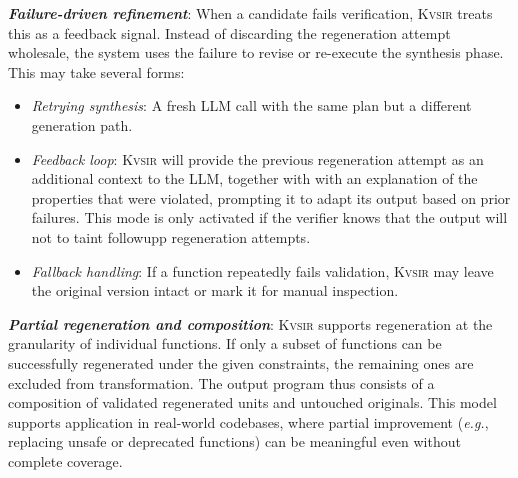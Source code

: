 \documentclass[sigplan]{acmart}
\def\eg{{\em e.g.}, }
\newcommand{\sys}{{\scshape Kv{\textalpha}sir}\xspace}
\newcommand{\heading}[1]{\vspace{2pt}\noindent\textbf{\emph{#1}}:\enspace}
\begin{document}
\heading{Failure-driven refinement}
When a candidate fails verification, \sys treats this as a feedback signal. Instead of discarding the regeneration attempt wholesale, the system uses the failure to revise or re-execute the synthesis phase. This may take several forms:
\begin{itemize}
  \item \emph{Retrying synthesis}: A fresh LLM call with the same plan but a different generation path.
  \item \emph{Feedback loop}: \sys will provide the previous regeneration attempt 
    as an additional context to the LLM, together with with an explanation of the properties that were violated, prompting it to adapt its output based on prior failures.
    This mode is only activated if the verifier knows that the output will not to taint
    followupp regeneration attempts.
  \item \emph{Fallback handling}: If a function repeatedly fails validation, \sys may leave the original version intact or mark it for manual inspection.
\end{itemize}


\heading{Partial regeneration and composition}
\sys supports regeneration at the granularity of individual functions. If only a subset of functions can be successfully regenerated under the given constraints, the remaining ones are excluded from transformation.
The output program thus consists of a composition of validated regenerated units and untouched originals.
This model supports application in real-world codebases, where partial improvement (\eg replacing unsafe or deprecated functions) can be meaningful even without complete coverage.


\end{document}
